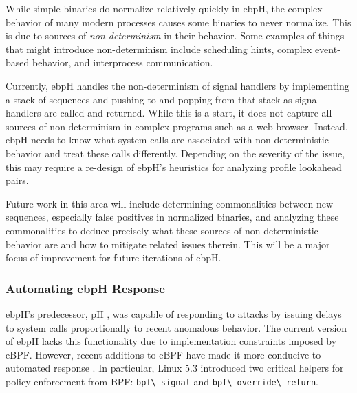 \documentclass[
  12pt]{findlay}
\newcommand{\passthrough}[1]{#1}
\begin{document}
\label{further_non_determinism}

While simple binaries do normalize relatively quickly in ebpH, the
complex behavior of many modern processes causes some binaries to never
normalize. This is due to sources of \emph{non-determinism} in their
behavior. Some examples of things that might introduce non-determinism
include scheduling hints, complex event-based behavior, and interprocess
communication.

Currently, ebpH handles the non-determinism of signal handlers by
implementing a stack of sequences and pushing to and popping from that
stack as signal handlers are called and returned. While this is a start,
it does not capture all sources of non-determinism in complex programs
such as a web browser. Instead, ebpH needs to know what system calls are
associated with non-deterministic behavior and treat these calls
differently. Depending on the severity of the issue, this may require a
re-design of ebpH's heuristics for analyzing profile lookahead pairs.

Future work in this area will include determining commonalities between
new sequences, especially false positives in normalized binaries, and
analyzing these commonalities to deduce precisely what these sources of
non-deterministic behavior are and how to mitigate related issues
therein. This will be a major focus of improvement for future iterations
of ebpH.

\hypertarget{automating-ebph-response}{%
\subsubsection{Automating ebpH
Response}\label{automating-ebph-response}}

\label{response_automation}

ebpH's predecessor, pH \autocite{soma02}, was capable of responding to
attacks by issuing delays to system calls proportionally to recent
anomalous behavior. The current version of ebpH lacks this functionality
due to implementation constraints imposed by eBPF. However, recent
additions to eBPF have made it more conducive to automated response
\autocite{gregg19bpf}. In particular, Linux 5.3 introduced two critical
helpers \autocite{bcc} for policy enforcement from BPF:
\passthrough{\lstinline!bpf\_signal!} and
\passthrough{\lstinline!bpf\_override\_return!}.
\end{document}
